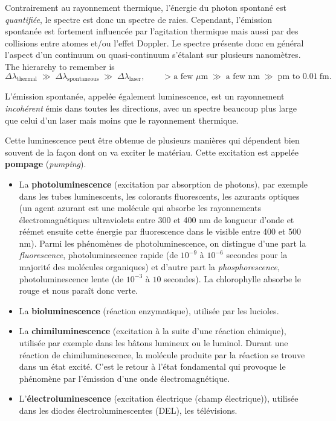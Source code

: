 Contrairement au rayonnement thermique, l'énergie du photon spontané est
\emph{quantifiée}, le spectre est donc un spectre de raies. Cependant,
l'émission spontanée est fortement influencée par l'agitation thermique mais
aussi par des collisions entre atomes et/ou l'effet Doppler. Le spectre présente
donc en général l'aspect d'un continuum ou quasi-continuum s'étalant sur
plusieurs nanomètres. The hierarchy to remember is
\[\Delta\lambda_{\text{thermal}}\;\gg\;\Delta\lambda_{\text{spontaneous}}\;\gg\;
  \Delta\lambda_{\text{laser}},\qquad
  >\!\text{a few }\mu\text{m}\;\gg\;\text{a few nm}\;\gg\;
  \text{pm to }0.01\ \text{fm}.\]

\begin{conclusion}
  L'émission spontanée, appelée également luminescence, est un rayonnement
  \emph{incohérent} émis dans toutes les directions, avec un spectre beaucoup
  plus large que celui d'un laser mais moins que le rayonnement thermique.
\end{conclusion}

Cette luminescence peut être obtenue de plusieurs manières qui dépendent bien
souvent de la façon dont on va exciter le matériau. Cette excitation est
appelée \textbf{pompage} (\textit{pumping}).

\begin{itemize}
  \item La \textbf{photoluminescence} (excitation par absorption de photons),
    par exemple dans les tubes luminescents, les colorants fluorescents, les
    azurants optiques (un agent azurant est une molécule qui absorbe les
    rayonnements électromagnétiques ultraviolets entre 300 et 400 nm de
    longueur d'onde et réémet ensuite cette énergie par fluorescence dans le
    visible entre 400 et 500 nm). Parmi les phénomènes de photoluminescence, on
    distingue d'une part la \textit{fluorescence}, photoluminescence rapide (de
    $10^{-9}$ à $10^{-6}$ secondes pour la majorité des molécules organiques) et
    d'autre part la \textit{phosphorescence}, photoluminescence lente (de
    $10^{-3}$ à $10$ secondes). La chlorophylle absorbe le rouge et nous paraît
    donc verte.
  \item La \textbf{bioluminescence} (réaction enzymatique), utilisée par les
    lucioles.
  \item La \textbf{chimiluminescence} (excitation à la suite d'une réaction
    chimique), utilisée par exemple dans les bâtons lumineux ou le luminol.
    Durant une réaction de chimiluminescence, la molécule produite par la
    réaction se trouve dans un état excité. C'est le retour à l'état fondamental
    qui provoque le phénomène par l'émission d'une onde électromagnétique.
  \item L'\textbf{électroluminescence} (excitation électrique (champ
    électrique)), utilisée dans les diodes électroluminescentes (DEL), les
    télévisions.
\end{itemize}

